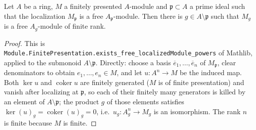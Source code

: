 \begin{lemma}
\label{lem:pc-free-on-principal-open}
Let $A$ be a ring, $M$ a finitely presented $A$-module and
$\mathfrak p\subset A$ a prime ideal such that the localization
$M_{\mathfrak p}$ is a free $A_{\mathfrak p}$-module.  Then there is
$g\in A\setminus\mathfrak p$ such that $M_g$ is a free $A_g$-module of
finite rank.
\mathlibok\ 
\end{lemma}
\begin{proof}
This is
\texttt{Module.FinitePresentation.exists\_free\_localizedModule\_powers}
of Mathlib, applied to the submonoid $A\setminus\mathfrak p$.  Directly:
choose a basis
$\overline e_1,\dots,\overline e_n$ of $M_{\mathfrak p}$, clear
denominators to obtain $e_1,\dots,e_n\in M$, and let
$u:A^n\to M$ be the induced map.  Both $\ker u$ and $\operatorname{coker}u$
are finitely generated ($M$ is of finite presentation) and vanish after
localizing at $\mathfrak p$, so each of their finitely many generators
is killed by an element of $A\setminus\mathfrak p$; the product $g$ of
those elements satisfies $\ker(u)_g=\operatorname{coker}(u)_g=0$, i.e.\
$u_g:A_g^n\to M_g$ is an isomorphism.  The rank $n$ is finite because
$M$ is finite.
\end{proof}

